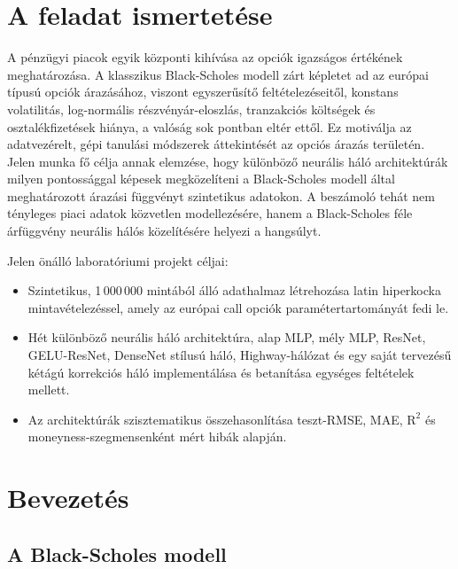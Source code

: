 \section{A feladat ismertetése}

A pénzügyi piacok egyik központi kihívása az opciók igazságos értékének meghatározása.
A klasszikus Black-Scholes modell \cite{blackscholes1973} zárt képletet ad az európai típusú opciók árazásához, viszont egyszerűsítő feltételezéseitől, konstans volatilitás, log-normális részvényár-eloszlás, tranzakciós költségek és osztalékfizetések hiánya, a valóság sok pontban eltér ettől. Ez motiválja az adatvezérelt, gépi tanulási módszerek áttekintését az opciós árazás területén. Jelen munka fő célja annak elemzése, hogy különböző neurális háló architektúrák milyen pontossággal képesek megközelíteni a Black-Scholes modell által meghatározott árazási függvényt szintetikus adatokon. A beszámoló tehát nem tényleges piaci adatok közvetlen modellezésére, hanem a Black-Scholes féle árfüggvény neurális hálós közelítésére helyezi a hangsúlyt.

Jelen önálló laboratóriumi projekt céljai:

\begin{itemize}
    \item Szintetikus, 1\,000\,000 mintából álló adathalmaz létrehozása
          latin hiperkocka mintavételezéssel, amely az európai call opciók paramétertartományát fedi le.
    \item Hét különböző neurális háló architektúra, alap MLP, mély MLP, ResNet, GELU-ResNet, DenseNet stílusú háló, Highway-hálózat és egy saját tervezésű kétágú korrekciós háló implementálása és betanítása egységes feltételek mellett.
    \item Az architektúrák szisztematikus összehasonlítása teszt-RMSE, MAE,
          $\text{R}^2$ és moneyness-szegmensenként mért hibák alapján.
\end{itemize}

\section{Bevezetés}

\subsection{A Black-Scholes modell}

